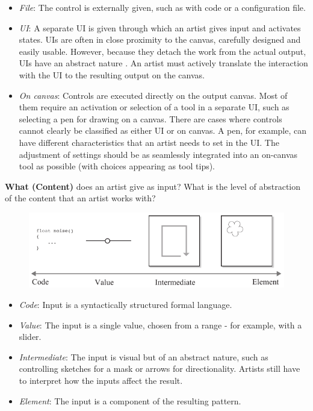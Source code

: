 \begin{itemize}
    \item \textit{File}: The control is externally given, such as with code or a configuration file.
    \item \textit{UI}: A separate UI is given through which an artist gives input and activates states. UIs are often in close proximity to the canvas, carefully designed and easily usable. However, because they detach the work from the actual output, UIs have an abstract nature . An artist must actively translate the interaction with the UI to the resulting output on the canvas.
    \item \textit{On canvas}: Controls are executed directly on the output canvas. Most of them require an activation or selection of a tool in a separate UI, such as selecting a pen for drawing on a canvas. 
    There are cases where controls cannot clearly be classified as either UI or on canvas. A pen, for example, can have different characteristics that an artist needs to set in the UI. The adjustment of settings should be as seamlessly integrated into an on-canvas tool as possible (\eg with choices appearing as tool tips). 
\end{itemize}


\noindent\textbf{What (Content)} does an artist give as input? What is the level of abstraction of the content that an artist works with?
\begin{figure}[H]
    \centering
        \includegraphics[width=\controlParamsFigWidth\linewidth]{figures/control_paradigms/what.pdf}
\end{figure}

\begin{itemize}
    \item \textit{Code}: Input is a syntactically structured formal language.
    \item \textit{Value}: The input is a single value, chosen from a range - for example, with a slider.
    \item \textit{Intermediate}: The input is visual but of an abstract nature, such as controlling sketches for a mask or arrows for directionality. Artists still have to interpret how the inputs affect the result.
    \item \textit{Element}: The input is a component of the resulting pattern.
\end{itemize}

